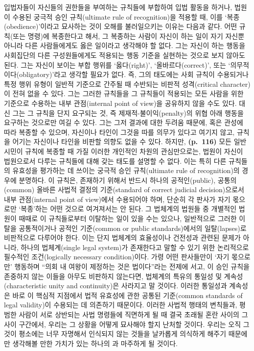 입법자들이 자신들의 권한들을 부여하는 규칙들에 부합하여 입법 활동을
하거나, 법원이 수용된 궁극적 승인 규칙(ultimate rule of recognition)을
적용할 때, 이를 ‘복종(obedience)’이라고 묘사하는 것이 오해를
불러일으키는 이유는 다음과 같다. 어떤 규칙(또는 명령)에 복종한다고 해서,
그 복종하는 사람이 자신이 하는 일이 자기 자신뿐 아니라 다른 사람들에게도
옳은 일이라고 생각해야 할  없다. 그는 자신이 하는
행동을 사회집단의 다른 구성원들에게도 적용되는 행동 기준을 실현하는
것으로 보지 않아도 된다. 그는 자신이 보이는 부합 행위를 ‘옳다(right)’,
‘올바르다(correct)’, 또는 ‘의무적이다(obligatory)’라고 생각할 필요가
없다. 즉, 그의 태도에는 사회 규칙이 수용되거나 특정 행위 유형이 일반적
기준으로 간주될 때 수반되는 비판적 성격(critical character)이 전혀 없을
수 있다. 그는 그러한 규칙들을 그 규칙들이 적용되는 모든 사람을 위한
기준으로 수용하는 내부 관점(internal point of view)을 공유하지 않을 수도
있다. 대신 그는 그 규칙을 단지  요구되는 것, 즉
제재적-불이익(penalty)의 위협 아래 행동을 요구하는 것으로만 여길 수
있다. 그는 그저 결과에 대한 두려움 때문에, 혹은 관성에 따라 복종할 수
있으며, 자신이나 타인이 그것을 따를 의무가 있다고 여기지 않고, 규칙을
어기는 자신이나 타인을 비판할 의향도 없을 수 있다. 하지만,
\textbf{(p.~116)} 모든 일반 시민이 규칙에 복종할 때 가질  이러한 개인적인 차원의 관심만으로는, 법원이 자신이 법원으로서
다루는 규칙들에 대해 갖는 태도를 설명할 수 없다. 이는 특히 다른 규칙들의
유효성을 평가하는 데 쓰이는 궁극적 승인 규칙(ultimate rule of
recognition)의 경우에 분명하다. 이 규칙은, 존재하기 위해서 반드시 하나의
공적인(public), 공통의(common) 올바른 사법적 결정의 기준(standard of
correct judicial decision)으로서 내부 관점(internal point of view)에서
수용되어야 하며, 단순히 각 판사가 자기 몫으로만 ‘복종’하는 어떤 것으로
여겨져서는 안 된다. 그 법체계의 법원들 중 개별적인 법원이 때때로 이
규칙들로부터 이탈하는 일이 있을 수는 있으나, 일반적으로 그러한 이탈을
공통적이거나 공적인 기준(common or public standards)에서의
일탈(lapses)로 비판적으로 다루어야 한다. 이는 단지 법체계의 효율성이나
건전성과 관련된 문제가 아니라, 하나의 법체계(single legal system)가
존재한다고 말할 수 있기 위한 논리적으로 필수적인 조건(logically
necessary condition)이다. 가령 어떤 판사들만이 ‘자기 몫으로만’ 행동하며
“의회 내 여왕이 제정하는 것은 법이다”라는 전제에 서고, 이 승인 규칙을
존중하지 않는 이들을 아무도 비판하지 않는다면, 법체계의 특유의 통일성 및
계속성(characteristic unity and continuity)은 사라지고 말 것이다. 이러한
통일성과 계속성은 바로 이 핵심적 지점에서 법적 유효성에 관한 공통된
기준(common standards of legal validity)이 수용되는 데 의존하기
때문이다. 이러한 사법적 행태의 변칙들과, 평범한 사람이 서로 상반되는
사법 명령들에 직면하게 될 때 결국 초래될 혼란 사이의 그 사이 구간에서,
우리는 그 상황을 어떻게 묘사해야 할지 난처할 것이다. 우리는 오직 그것이
평소에는 너무 자명해서 인식되지 않는 것들을 날카롭게 의식하게 해주기
때문에만 생각해볼 만한 가치가 있는 하나의 과 마주하게 될 것이다.

